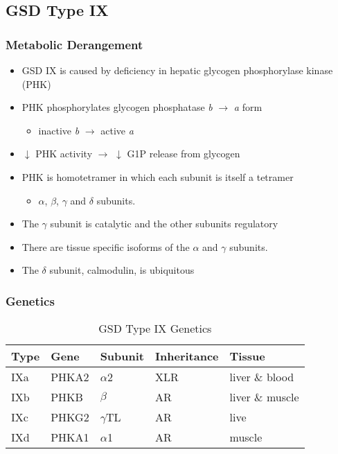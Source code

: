 \documentclass{scrartcl}
\begin{document}
\subsection{GSD Type IX}
\label{sec:orgecb8e66}
\subsubsection{Metabolic Derangement}
\label{sec:org0d5e6e1}
\begin{itemize}
\item GSD IX is caused by deficiency in hepatic glycogen phosphorylase kinase (PHK)
\item PHK phosphorylates glycogen phosphatase \emph{b} \(\to\) \emph{a} form
\begin{itemize}
\item inactive \emph{b} \(\to\)  active \emph{a}
\end{itemize}
\item \(\downarrow\) PHK activity \(\to\) \(\downarrow\) G1P release from glycogen
\item PHK is homotetramer in which each subunit is itself a tetramer
\begin{itemize}
\item \(\alpha\), \(\beta\), \(\gamma\) and \(\delta\) subunits.
\end{itemize}
\item The \(\gamma\) subunit is catalytic and the other subunits regulatory
\item There are tissue specific isoforms of the \(\alpha\) and \(\gamma\) subunits.
\item The \(\delta\) subunit, calmodulin, is ubiquitous
\end{itemize}

\subsubsection{Genetics}
\label{sec:org2c2e8d0}
\begin{table}[htbp]
\caption{\label{tab:org941dad9}
GSD Type IX Genetics}
\centering
\begin{tabular}{lllll}
Type & Gene & Subunit & Inheritance & Tissue\\
\hline
IXa & PHKA2 & \(\alpha\)2 & XLR & liver \& blood\\
IXb & PHKB & \(\beta\) & AR & liver \& muscle\\
IXc & PHKG2 & \(\gamma\)TL & AR & live\\
IXd & PHKA1 & \(\alpha\)1 & AR & muscle\\
\end{tabular}
\end{table}
\end{document}
